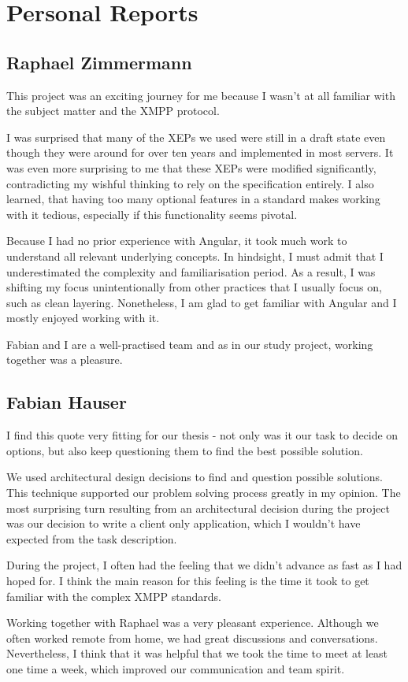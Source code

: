 \section{Personal Reports}\label{sec:personal-reports}

\subsection{Raphael Zimmermann}

This project was an exciting journey for me because I wasn't at all familiar with the subject matter and the XMPP protocol.

I was surprised that many of the XEPs we used were still in a draft state even though they were around for over ten years and implemented in most servers.
It was even more surprising to me that these XEPs were modified significantly, contradicting my wishful thinking to rely on the specification entirely.
I also learned, that having too many optional features in a standard makes working with it tedious, especially if this functionality seems pivotal.

Because I had no prior experience with Angular, it took much work to understand all relevant underlying concepts.
In hindsight, I must admit that I underestimated the complexity and familiarisation period.
As a result, I was shifting my focus unintentionally from other practices that I usually focus on, such as clean layering.
Nonetheless, I am glad to get familiar with Angular and I mostly enjoyed working with it.

Fabian and I are a well-practised team and as in our study project, working together was a pleasure.

\subsection{Fabian Hauser}

%
I find this quote very fitting for our thesis - not only was it our task to decide on options,
but also keep questioning them to find the best possible solution.

We used architectural design decisions to find and question possible solutions.
This technique supported our problem solving process greatly in my opinion.
The most surprising turn resulting from an architectural decision during the project was our decision to write a client only application,
which I wouldn't have expected from the task description.

During the project, I often had the feeling that we didn't advance as fast as I had hoped for.
I think the main reason for this feeling is the time it took to get familiar with the complex XMPP standards.

Working together with Raphael was a very pleasant experience.
Although we often worked remote from home, we had great discussions and conversations.
Nevertheless, I think that it was helpful that we took the time to meet at least one time a week, which improved our communication and team spirit.